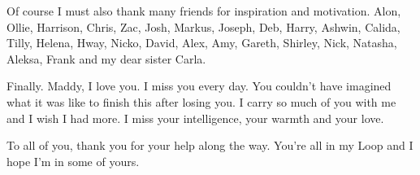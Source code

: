 Of course I must also thank many friends for inspiration and motivation. Alon, Ollie, Harrison, Chris, Zac, Josh, Markus, Joseph, Deb, Harry, Ashwin, Calida, Tilly, Helena, Hway, Nicko, David, Alex, Amy, Gareth, Shirley, Nick, Natasha, Aleksa, Frank and my dear sister Carla.

Finally. Maddy, I love you. I miss you every day. You couldn't have imagined what it was like to finish this after losing you. I carry so much of you with me and I wish I had more. I miss your intelligence, your warmth and your love.

To all of you, thank you for your help along the way. You're all in my Loop \cite{hofstadter2007} and I hope I'm in some of yours.
